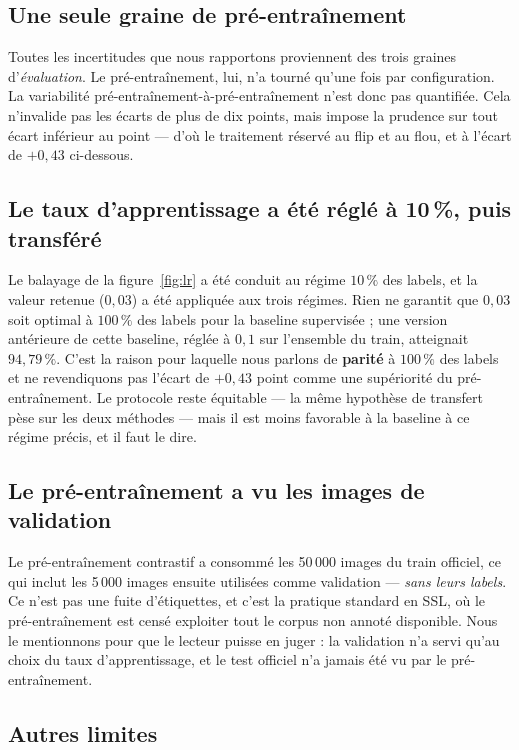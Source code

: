\documentclass[11pt,a4paper]{article}
\begin{document}
\subsection{Une seule graine de pré-entraînement}

Toutes les incertitudes que nous rapportons proviennent des trois graines d'\emph{évaluation}.
Le pré-entraînement, lui, n'a tourné qu'une fois par configuration. La variabilité
pré-entraînement-à-pré-entraînement n'est donc pas quantifiée. Cela n'invalide pas les
écarts de plus de dix points, mais impose la prudence sur tout écart inférieur au point ---
d'où le traitement réservé au flip et au flou, et à l'écart de $+0{,}43$ ci-dessous.

\subsection{Le taux d'apprentissage a été réglé à 10\,\%, puis transféré}

Le balayage de la figure~\ref{fig:lr} a été conduit au régime $10\,\%$ des labels, et la
valeur retenue ($0{,}03$) a été appliquée aux trois régimes. Rien ne garantit que $0{,}03$
soit optimal à $100\,\%$ des labels pour la baseline supervisée ; une version antérieure de
cette baseline, réglée à $0{,}1$ sur l'ensemble du train, atteignait $94{,}79\,\%$. C'est la
raison pour laquelle nous parlons de \textbf{parité} à $100\,\%$ des labels et ne
revendiquons pas l'écart de $+0{,}43$ point comme une supériorité du pré-entraînement. Le
protocole reste équitable --- la même hypothèse de transfert pèse sur les deux méthodes ---
mais il est moins favorable à la baseline à ce régime précis, et il faut le dire.

\subsection{Le pré-entraînement a vu les images de validation}

Le pré-entraînement contrastif a consommé les 50\,000 images du train officiel, ce qui
inclut les 5\,000 images ensuite utilisées comme validation --- \emph{sans leurs labels}. Ce
n'est pas une fuite d'étiquettes, et c'est la pratique standard en SSL, où le
pré-entraînement est censé exploiter tout le corpus non annoté disponible. Nous le
mentionnons pour que le lecteur puisse en juger : la validation n'a servi qu'au choix du
taux d'apprentissage, et le test officiel n'a jamais été vu par le pré-entraînement.

\subsection{Autres limites}
\end{document}
